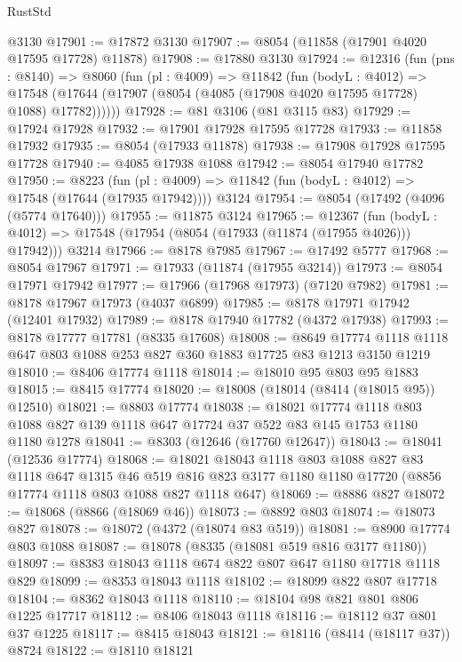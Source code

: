 \begin{lexlean}{RustStd}
\begin{coremodule}
    @3130
@17901 := @17872 @3130
@17907 := @8054 (@11858 (@17901 @4020 @17595 @17728) @11878)
@17908 := @17880 @3130
@17924 := @12316
    (fun (pns : @8140) =>
    @8060
      (fun (pl : @4009) =>
      @11842
        (fun (bodyL : @4012) =>
        @17548 (@17644 (@17907 (@8054 (@4085 (@17908 @4020 @17595 @17728) @1088) @17782))))))
@17928 := @81 @3106 (@81 @3115 @83)
@17929 := @17924 @17928
@17932 := @17901 @17928 @17595 @17728
@17933 := @11858 @17932
@17935 := @8054 (@17933 @11878)
@17938 := @17908 @17928 @17595 @17728
@17940 := @4085 @17938 @1088
@17942 := @8054 @17940 @17782
@17950 := @8223
    (fun (pl : @4009) => @11842 (fun (bodyL : @4012) => @17548 (@17644 (@17935 @17942))))
    @3124
@17954 := @8054 (@17492 (@4096 (@5774 @17640)))
@17955 := @11875 @3124
@17965 := @12367
    (fun (bodyL : @4012) => @17548 (@17954 (@8054 (@17933 (@11874 (@17955 @4026))) @17942)))
    @3214
@17966 := @8178 @7985
@17967 := @17492 @5777
@17968 := @8054 @17967
@17971 := @17933 (@11874 (@17955 @3214))
@17973 := @8054 @17971 @17942
@17977 := @17966 (@17968 @17973) (@7120 @7982)
@17981 := @8178 @17967 @17973 (@4037 @6899)
@17985 := @8178 @17971 @17942 (@12401 @17932)
@17989 := @8178 @17940 @17782 (@4372 @17938)
@17993 := @8178 @17777 @17781 (@8335 @17608)
@18008 := @8649 @17774 @1118 @1118 @647 @803 @1088 @253 @827 @360 @1883 @17725 @83 @1213 @3150 @1219
@18010 := @8406 @17774 @1118
@18014 := @18010 @95 @803 @95 @1883
@18015 := @8415 @17774
@18020 := @18008 (@18014 (@8414 (@18015 @95)) @12510)
@18021 := @8803 @17774
@18038 := @18021
    @17774
    @1118
    @803
    @1088
    @827
    @139
    @1118
    @647
    @17724
    @37
    @522
    @83
    @145
    @1753
    @1180
    @1180
    @1278
@18041 := @8303 (@12646 (@17760 @12647))
@18043 := @18041 (@12536 @17774)
@18068 := @18021
    @18043
    @1118
    @803
    @1088
    @827
    @83
    @1118
    @647
    @1315
    @46
    @519
    @816
    @823
    @3177
    @1180
    @1180
    @17720
    (@8856 @17774 @1118 @803 @1088 @827 @1118 @647)
@18069 := @8886 @827
@18072 := @18068 (@8866 (@18069 @46))
@18073 := @8892 @803
@18074 := @18073 @827
@18078 := @18072 (@4372 (@18074 @83 @519))
@18081 := @8900 @17774 @803 @1088
@18087 := @18078 (@8335 (@18081 @519 @816 @3177 @1180))
@18097 := @8383 @18043 @1118 @674 @822 @807 @647 @1180 @17718 @1118 @829
@18099 := @8353 @18043 @1118
@18102 := @18099 @822 @807 @17718
@18104 := @8362 @18043 @1118
@18110 := @18104 @98 @821 @801 @806 @1225 @17717
@18112 := @8406 @18043 @1118
@18116 := @18112 @37 @801 @37 @1225
@18117 := @8415 @18043
@18121 := @18116 (@8414 (@18117 @37)) @8724
@18122 := @18110 @18121

\end{coremodule}
\end{lexlean}
